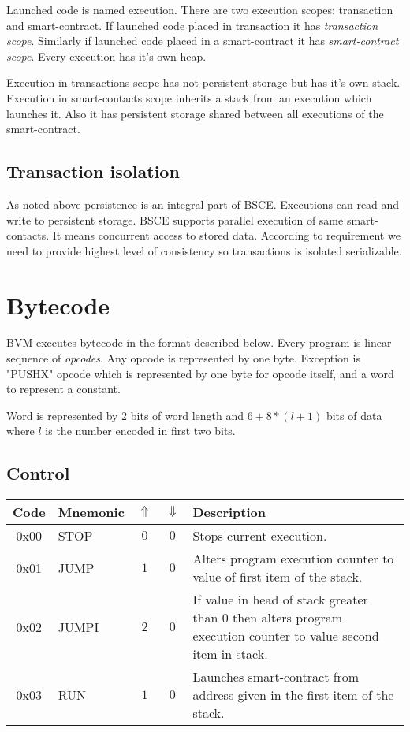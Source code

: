 \documentclass[12pt,a4paper]{article}
\begin{document}
Launched code is named execution. There are two execution scopes: transaction and smart-contract. If launched code placed in transaction it has \textit{transaction scope}. Similarly if launched code placed in a smart-contract it has \textit{smart-contract scope}. Every execution has it's own heap. 

Execution in transactions scope has not persistent storage but has it's own stack. Execution in smart-contacts scope inherits a stack from an execution which launches it. Also it has persistent storage shared between all executions of the smart-contract.

\subsection{Transaction isolation}

As noted above persistence is an integral part of BSCE. Executions can read and write to persistent storage. BSCE supports parallel execution of same smart-contacts. It means concurrent access to stored data. According to requirement we need to provide highest level of consistency so transactions is isolated serializable\cite{transaction-isolation}. 

\section{Bytecode}

BVM executes bytecode in the format described below. Every program is linear sequence of \textit{opcodes}. Any opcode is represented by one byte. Exception is "PUSHX" opcode which is represented by one byte for opcode itself, and a word to represent a constant.

Word is represented by 2 bits of word length and $6+8*(l+1)$ bits of data where $l$ is the number encoded in first two bits.

\subsection{Control}
\begin{tabularx}{\textwidth}{ c l c c p{7cm} }
\textbf{Code} & \textbf{Mnemonic} & \textbf{$\Uparrow$} & \textbf{$\Downarrow$} & \textbf{Description} \\
\hline
0x00 & STOP & $0$ & $0$ & Stops current execution. \\
\hline
0x01 & JUMP & $1$ & $0$ & Alters program execution counter to value of first item of the stack. \\
\hline
0x02 & JUMPI & $2$ & $0$ & If value in head of stack greater than 0 then alters program execution counter to value second item in stack.  \\
\hline
0x03 & RUN & $1$ & $0$ & Launches smart-contract from address given in the first item of the stack.  \\
\end{tabularx}
\end{document}
